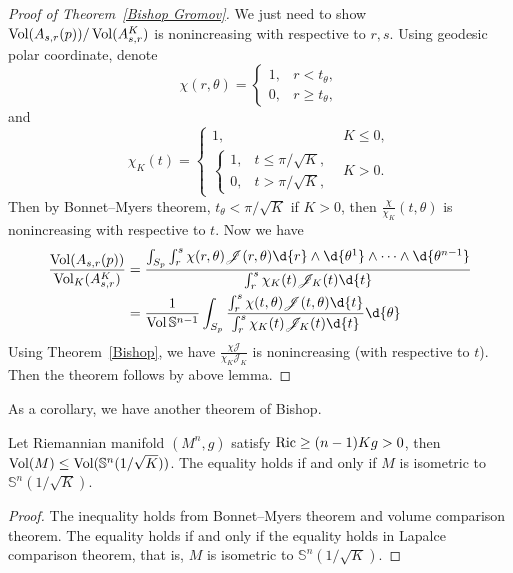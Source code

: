 \begin{proof}[Proof of Theorem~\ref{Bishop Gromov}]
    We just need to show $\operatorname{Vol}(A_{s,r}(p))/\operatorname{Vol}(A_{s,r}^K)$ is nonincreasing with respective to $r,s$.
    Using geodesic polar coordinate, denote
    \[\chi(r,\theta)=\begin{cases}
        1, & r<t_\theta,\\
        0, & r\geq t_\theta,
    \end{cases}\]
    and
    \[\chi_K(t)=\begin{cases}
        1, & K\leq 0,\\
        \begin{cases}
            1, & t\leq\pi/\sqrt{K},\\
            0, & t>\pi/\sqrt{K},
        \end{cases} & K>0.
    \end{cases}\]
    Then by Bonnet--Myers theorem, $t_\theta<\pi/\sqrt{K}$ if $K>0$, then $\frac{\chi}{\chi_K}(t,\theta)$ is nonincreasing with respective to $t$.
    Now we have
    \begin{align*}
        \frac{\Vol(A_{s,r}(p))}{\Vol_K(A^K_{s,r})}&=\frac{\int_{S_p}\int_r^s\chi(r,\theta)\mathscr{J}(r,\theta)\d{r}\wedge\d{\theta^1}\wedge\cdots\wedge\d{\theta^{n-1}}}{\int_r^s\chi_K(t)\mathscr{J}_K(t)\d{t}}\\
        &=\frac{1}{\Vol{\mathbb{S}^{n-1}}}\int_{S_p}\frac{\int_r^s\chi(t,\theta)\mathscr{J}(t,\theta)\d{t}}{\int_r^s\chi_K(t)\mathscr{J}_K(t)\d{t}}\d{\theta}
    \end{align*}
    Using Theorem~\ref{Bishop}, we have $\frac{\chi\mathscr{J}}{\chi_K\mathscr{J}_K}$ is nonincreasing (with respective to $t$).
    Then the theorem follows by above lemma.
\end{proof}

As a corollary, we have another theorem of Bishop.
\begin{thm}[Bishop]
    Let Riemannian manifold $(M^n,g)$ satisfy $\operatorname{Ric}\geq(n-1)Kg>0$, then $\operatorname{Vol}(M)\leq\operatorname{Vol}(\mathbb{S}^n(1/\sqrt{K}))$.
    The equality holds if and only if $M$ is isometric to $\mathbb{S}^n(1/\sqrt{K})$.
\end{thm}
\begin{proof}
    The inequality holds from Bonnet--Myers theorem and volume comparison theorem.
    The equality holds if and only if the equality holds in Lapalce comparison theorem, that is, $M$ is isometric to $\mathbb{S}^n(1/\sqrt{K})$.
\end{proof}

